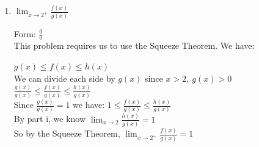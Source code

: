 \documentclass[nooutcomes, handout]{ximera}
\begin{document}
\begin{problem}
\begin{enumerate}
\begin{enumerate}
		\item $\lim_{x \to 2^+}\frac{f(x)}{g(x)}$

		\begin{freeResponse}
		Form: $\frac{{0}}{0}$ \\
		This problem requires us to use the Squeeze Theorem.  We have: \\ 
		\begin{center}
		$g(x) \le f(x) \le h(x)$ \\

		We can divide each side by $g(x)$ since $x>2,\ g(x)>0$\\
		 $\frac{g(x)}{g(x)} \le \frac{f(x)}{g(x)} \le \frac{h(x)}{g(x)}$\\
		Since $\frac{g(x)}{g(x)}=1$ we have: $1 \le \frac{f(x)}{g(x)} \le \frac{h(x)}{g(x)}$\\
		By part i, we know $\lim_{x \to 2}\frac{h(x)}{g(x)}=1$\\
		So by the Squeeze Theorem, $\lim_{x \to 2^+}\frac{f(x)}{g(x)}=1$
			\end{center}
		\end{freeResponse}	

		\end{enumerate}
	
	\end{enumerate}

	
\end{problem}



								
				
				
	
\end{document}
